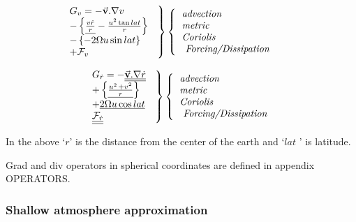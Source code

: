 \documentclass[12pt]{book}
\begin{document}
\begin{equation}
\left. 
\begin{tabular}{l}
$G_{v}=-\vec{\mathbf{v}}.\nabla v$ \\ 
$-\left\{ \underline{\frac{v\dot{r}}{{r}}}-\frac{u^{2}\tan lat}{{r}}\right\} 
$ \\ 
$-\left\{ -2\Omega u\sin lat\right\} $ \\ 
$+\mathcal{F}_{v}$
\end{tabular}
\ \right\} \left\{ 
\begin{tabular}{l}
\textit{advection} \\ 
\textit{metric} \\ 
\textit{Coriolis} \\ 
\textit{\ Forcing/Dissipation}
\end{tabular}
\ \right. \qquad  \label{eq:gv-spherical}
\end{equation}
\qquad \qquad \qquad \qquad \qquad

\begin{equation}
\left. 
\begin{tabular}{l}
$G_{\dot{r}}=-\underline{\underline{\vec{\mathbf{v}}.\nabla \dot{r}}}$ \\ 
$+\left\{ \underline{\frac{u^{_{^{2}}}+v^{2}}{{r}}}\right\} $ \\ 
${+}\underline{{2\Omega u\cos lat}}$ \\ 
$\underline{\underline{\mathcal{F}_{\dot{r}}}}$
\end{tabular}
\ \right\} \left\{ 
\begin{tabular}{l}
\textit{advection} \\ 
\textit{metric} \\ 
\textit{Coriolis} \\ 
\textit{\ Forcing/Dissipation}
\end{tabular}
\ \right.  \label{eq:gw-spherical}
\end{equation}
\qquad \qquad \qquad \qquad \qquad

In the above `${r}$' is the distance from the center of the earth and `$lat$
' is latitude.

Grad and div operators in spherical coordinates are defined in appendix
OPERATORS.


\subsubsection{Shallow atmosphere approximation}
\end{document}
